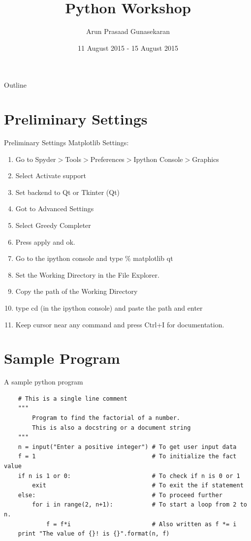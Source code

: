 \documentclass[10pt]{beamer}
\author[Arun, CAOS, IISc]{Arun Prasaad Gunasekaran}
\title{Python Workshop}
\institute{Indian Institute of Science}
\date{11 August 2015 - 15 August 2015}
\begin{document}
\begin{frame}
\titlepage
\end{frame}

\begin{frame}{Outline}
\tableofcontents
\end{frame}

\section{Preliminary Settings}

\begin{frame}{Preliminary Settings}
Matplotlib Settings:
	\begin{enumerate}
		\item Go to Spyder$>$Tools$>$Preferences$>$Ipython Console$>$Graphics
		\item Select Activate support
		\item Set backend to Qt or Tkinter (Qt)
		\item Got to Advanced Settings
		\item Select Greedy Completer
		\item Press apply and ok.
		\item Go to the ipython console and type \% matplotlib qt
		\item Set the Working Directory in the File Explorer.
		\item Copy the path of the Working Directory
		\item type cd (in the ipython console) and paste the path and enter
		\item Keep cursor near any command and press Ctrl+I for documentation.
	\end{enumerate}
\end{frame}

\section{Sample Program}
\begin{frame}[fragile]{A sample python program}
	\begin{lstlisting}
	# This is a single line comment
	"""
	    Program to find the factorial of a number.
	    This is also a docstring or a document string
	"""
	n = input("Enter a positive integer") # To get user input data
	f = 1                                 # To initialize the fact value
	if n is 1 or 0:                       # To check if n is 0 or 1
	    exit                              # To exit the if statement
	else:                                 # To proceed further
	    for i in range(2, n+1):           # To start a loop from 2 to n.
	        f = f*i                       # Also written as f *= i
	print "The value of {}! is {}".format(n, f)
	\end{lstlisting}
\end{frame}
\end{document}
